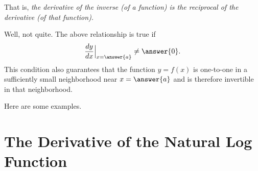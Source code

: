 \documentclass{ximera}
\begin{document}
\begin{question}
That is, \emph{the derivative of the inverse (of a function) is the reciprocal of the derivative (of that function).}

Well, not quite. The above relationship is true if
\[
  \frac{dy}{dx} \Big|_{x=\answer{a}} \neq \answer{0}.
\]
This condition also guarantees that the function $y=f(x)$ is one-to-one in a sufficiently small neighborhood near $x=\answer{a}$ and is therefore invertible in that neighborhood.

\end{question}

Here are some examples.




\section*{The Derivative of the Natural Log Function}
\end{document}
